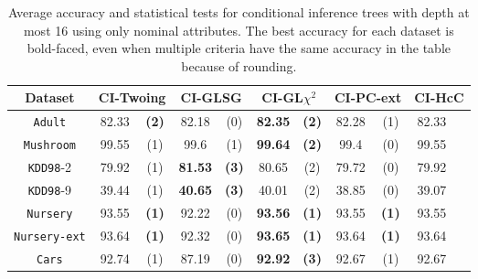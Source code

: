     \begin{table}
    \small
      \centering
        \caption{Average accuracy and statistical tests  for  conditional inference trees 
with depth at most 16 using only nominal attributes. The best accuracy for each dataset is bold-faced, even when multiple criteria have the same accuracy in the table because of rounding.}

\begin{tabular}{c|cc|cc|cc|cc|cc} 
Dataset             & \multicolumn{2}{c|}{CI-Twoing} &   \multicolumn{2}{c|}{CI-GLSG} & \multicolumn{2}{c|}{CI-GL$\chi^2$} & \multicolumn{2}{c|}{CI-PC-ext}& \multicolumn{2}{c}{CI-HcC}\\  \hline   
{\tt Adult}         & 82.33      &  {\bf (2)}        &   82.18      & (0)             & {\bf 82.35} &  {\bf (2)}           & 82.28       & (1)            & 82.33       &             \\
{\tt Mushroom}      & 99.55      &  (1)              &   99.6       & (1)             & {\bf 99.64} &  {\bf (2)}           & 99.4        & (0)            & 99.55       &             \\
{\tt KDD98}-2       & 79.92      &  (1)              &  {\bf 81.53} & {\bf (3)}       &  80.65      &  (2)                 & 79.72       & (0)            & 79.92       &             \\
{\tt KDD98}-9       & 39.44      &  (1)              &  {\bf 40.65} & {\bf (3)}       &  40.01      &  (2)                 & 38.85       & (0)            & 39.07       &             \\
{\tt Nursery}       & 93.55      &  {\bf (1)}        &   92.22      & (0)             & {\bf 93.56} &  {\bf (1)}           & 93.55       & {\bf (1)}      & 93.55       &             \\
{\tt Nursery-ext}   & 93.64      &  {\bf (1)}        &   92.32      & (0)             & {\bf 93.65} &  {\bf (1)}           & 93.64       & {\bf (1)}      & 93.64       &             \\
{\tt Cars}          & 92.74      &  (1)              &   87.19      & (0)             & {\bf 92.92} &  {\bf (3)}           & 92.67       & (1)            & 92.67       &            \\

\end{tabular}
\end{table}
